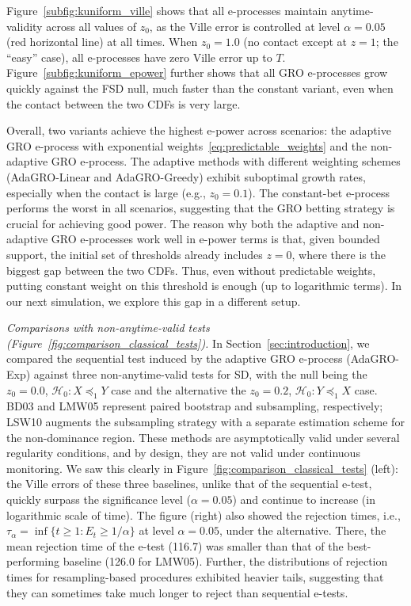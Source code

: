 \documentclass[12pt,twoside]{article}
\theoremstyle{plain}
\theoremstyle{definition}
\theoremstyle{remark}
\newcommand{\calH}{\mathcal{H}}
\newcommand{\fsd}{\preceq_{1}}
\begin{document}
Figure~\ref{subfig:kuniform_ville} shows that all e-processes maintain anytime-validity across all values of $z_0$, as the Ville error is controlled at level $\alpha=0.05$ (red horizontal line) at all times. 
When $z_0=1.0$ (no contact except at $z=1$; the ``easy'' case), all e-processes have zero Ville error up to $T$. 
Figure~\ref{subfig:kuniform_epower} further shows that all GRO e-processes grow quickly against the FSD null, much faster than the constant variant, even when the contact between the two CDFs is very large. 

Overall, two variants achieve the highest e-power across scenarios: the adaptive GRO e-process with exponential weights~\eqref{eq:predictable_weights} and the non-adaptive GRO e-process. 
The adaptive methods with different weighting schemes (AdaGRO-Linear and AdaGRO-Greedy) exhibit suboptimal growth rates, especially when the contact is large (e.g., $z_0=0.1$). 
The constant-bet e-process performs the worst in all scenarios, suggesting that the GRO betting strategy is crucial for achieving good power. 
The reason why both the adaptive and non-adaptive GRO e-processes work well in e-power terms is that, given bounded support, the initial set of thresholds already includes $z=0$, where there is the biggest gap between the two CDFs. 
Thus, even without predictable weights, putting constant weight on this threshold is enough (up to logarithmic terms). 
In our next simulation, we explore this gap in a different setup. 


\emph{Comparisons with non-anytime-valid tests (Figure~\ref{fig:comparison_classical_tests}).} 
In Section~\ref{sec:introduction}, we compared the sequential test induced by the adaptive GRO e-process (AdaGRO-Exp) against three non-anytime-valid tests for SD, with the null being the $z_0=0.0$, $\calH_0: X \fsd Y$ case and the alternative the $z_0=0.2$, $\calH_0: Y \fsd X$ case.  
BD03 and LMW05 represent paired bootstrap and subsampling, respectively; LSW10 augments the subsampling strategy with a separate estimation scheme for the non-dominance region. 
These methods are asymptotically valid under several regularity conditions, and by design, they are not valid under continuous monitoring. 
We saw this clearly in Figure~\ref{fig:comparison_classical_tests} (left): the Ville errors of these three baselines, unlike that of the sequential e-test, quickly surpass the significance level ($\alpha=0.05$) and continue to increase (in logarithmic scale of time). 
The figure (right) also showed the rejection times, i.e., $\tau_\alpha = \inf\{t \geq 1: E_t \geq 1/\alpha\}$ at level $\alpha=0.05$, under the alternative. 
There, the mean rejection time of the e-test (116.7) was smaller than that of the best-performing baseline (126.0 for LMW05). 
Further, the distributions of rejection times for resampling-based procedures exhibited heavier tails, suggesting that they can sometimes take much longer to reject than sequential e-tests.
\end{document}
